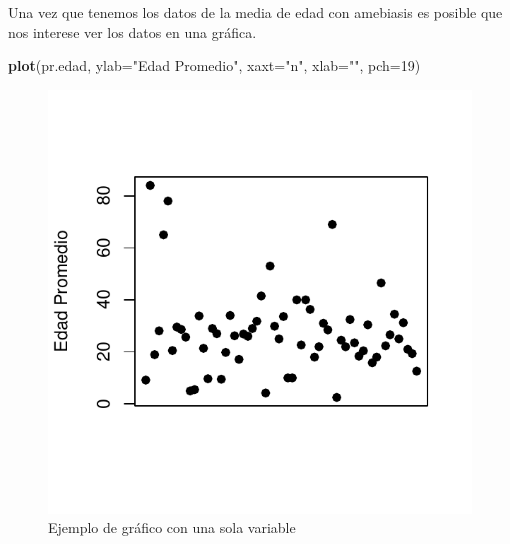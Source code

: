 \documentclass[]{article}
\newenvironment{Shaded}{\begin{snugshade}}{\end{snugshade}}
\newcommand{\KeywordTok}[1]{\textcolor[rgb]{0.13,0.29,0.53}{\textbf{{#1}}}}
\newcommand{\DataTypeTok}[1]{\textcolor[rgb]{0.13,0.29,0.53}{{#1}}}
\newcommand{\DecValTok}[1]{\textcolor[rgb]{0.00,0.00,0.81}{{#1}}}
\newcommand{\StringTok}[1]{\textcolor[rgb]{0.31,0.60,0.02}{{#1}}}
\newcommand{\CommentTok}[1]{\textcolor[rgb]{0.56,0.35,0.01}{\textit{{#1}}}}
\newcommand{\NormalTok}[1]{{#1}}
\begin{document}
\begin{Shaded}
\end{Shaded}

Una vez que tenemos los datos de la media de edad con amebiasis es
posible que nos interese ver los datos en una gráfica.

\begin{Shaded}
\begin{Highlighting}[]
\KeywordTok{plot}\NormalTok{(pr.edad, }\DataTypeTok{ylab=}\StringTok{"Edad Promedio"}\NormalTok{, }\DataTypeTok{xaxt=}\StringTok{"n"}\NormalTok{, }\DataTypeTok{xlab=}\StringTok{""}\NormalTok{, }\DataTypeTok{pch=}\DecValTok{19}\NormalTok{)}
\end{Highlighting}
\end{Shaded}

\begin{figure}

{\centering \includegraphics{index_files/figure-latex/unnamed-chunk-14-1} 

}

\caption{Ejemplo de gráfico con una sola variable}\label{fig:unnamed-chunk-14}
\end{figure}
\end{document}
